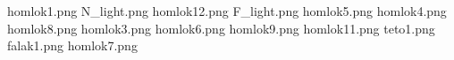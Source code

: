 homlok1.png
N_light.png
homlok12.png
F_light.png
homlok5.png
homlok4.png
homlok8.png
homlok3.png
homlok6.png
homlok9.png
homlok11.png
teto1.png
falak1.png
homlok7.png
